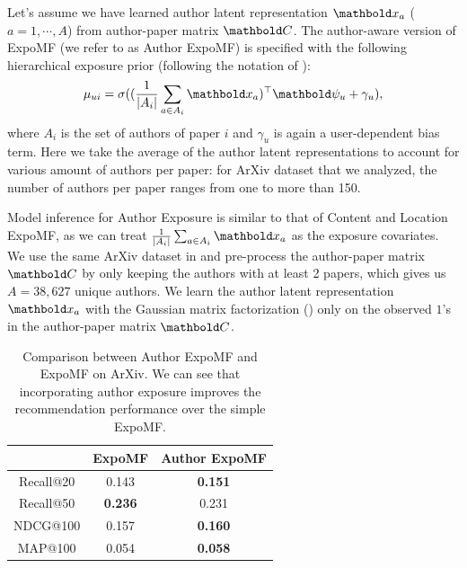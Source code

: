 Let's assume we have learned author latent representation $\mbx_a$ ($a = 1,\cdots, A$) from author-paper matrix $\mbC$. The author-aware version of ExpoMF (we refer to as Author ExpoMF) is specified with the following hierarchical exposure prior (following the notation of ): 
\[\mu_{ui} = \sigma((\frac{1}{|A_i|}\sum_{a\in A_i} \mbx_a)^\top \mb\psi_u + \gamma_u),\]
where $A_i$ is the set of authors of paper $i$ and $\gamma_u$ is again a user-dependent bias term. Here we take the average of the author latent representations to account for various amount of authors per paper: for ArXiv dataset that we analyzed, the number of authors per paper ranges from one to more than 150. 

Model inference for Author Exposure is similar to that of Content and Location ExpoMF, as we can treat $\frac{1}{|A_i|}\sum_{a\in A_i} \mbx_a$ as the exposure covariates. We use the same ArXiv dataset in  and pre-process the author-paper matrix $\mbC$ by only keeping the authors with at least 2 papers, which gives us $A = 38,627$ unique authors. We learn the author latent representation $\mbx_a$ with the Gaussian matrix factorization () only on the observed $1$'s in the author-paper matrix $\mbC$. 

\begin{table}
\centering
\begin{tabular}{ c c c }
\toprule
            & ExpoMF & Author ExpoMF \\ \midrule
  Recall@20 & 0.143 & \textbf{0.151}     \\ 
  Recall@50 & \textbf{0.236} & 0.231   	 \\ 
  NDCG@100  & 0.157 & \textbf{0.160}    \\ 
  MAP@100   & 0.054 & \textbf{0.058}    \\ 
\bottomrule 
\end{tabular}
\caption{Comparison between Author ExpoMF and ExpoMF on ArXiv. We can see that incorporating author exposure improves the recommendation performance over the simple ExpoMF.}
\label{chpt:expomf:tab:si_author_results}
\end{table}

